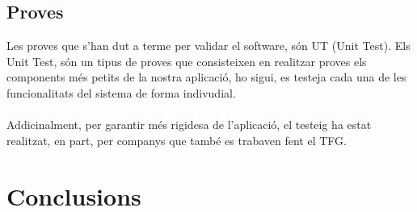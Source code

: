 \documentclass[11pt,catalan,listoffigures,listoftables]{tfgetsinf}
\begin{document}
\section{Proves}
Les proves que s'han dut a terme per validar el software, són UT (Unit Test). Els Unit Test, són un tipus de proves que consisteixen en realitzar proves els components més petits de la nostra aplicació, ho sigui, es testeja cada una de les funcionalitats del sistema de forma indivudial.\\ \\
Addicinalment, per garantir més rigidesa de l'aplicació, el testeig ha estat realitzat, en part, per companys que també es trabaven fent el TFG.


\chapter{Conclusions}
\end{document}
